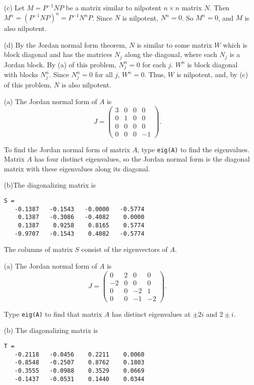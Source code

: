 (c) Let $M = P^{-1}NP$ be a matrix similar to nilpotent $n \times n$
matrix $N$.  Then $M^n = (P^{-1}NP)^n = P^{-1}N^nP$.  Since $N$ is
nilpotent, $N^n = 0$.  So $M^n = 0$, and $M$ is also nilpotent.

(d) By the Jordan normal form theorem, $N$ is similar to some matrix $W$ which
is block diagonal and has the matrices $N_j$ along the diagonal, where each
$N_j$ is a Jordan block.  By (a) of this problem, $N_j^n = 0$ for each
$j$.  $W^n$ is block diagonal with blocks $N_j^n$.  Since $N_j^n = 0$ for all
$j$, $W^n = 0$.  Thus, $W$ is nilpotent, and, by (c) of this problem, $N$
is also nilpotent.

(a) \ans The Jordan normal form of $A$ is
\[
J = \left(\begin{array}{rrrr}
3 & 0 & 0 & 0 \\
0 & 1 & 0 & 0 \\
0 & 0 & 0 & 0 \\
0 & 0 & 0 & -1 \end{array}\right).
\]

\soln
To find the Jordan normal form of matrix $A$, type {\tt eig(A)} to find
the eigenvalues.  Matrix $A$ has four distinct eigenvalues, so the
Jordan normal form is the diagonal matrix with these eigenvalues along
its diagonal.  

(b)\ans   The diagonalizing matrix is
\begin{verbatim}
S =
   -0.1387   -0.1543   -0.0000   -0.5774
    0.1387   -0.3086   -0.4082    0.0000
    0.1387    0.9258    0.8165    0.5774
   -0.9707   -0.1543    0.4082   -0.5774
\end{verbatim}

\soln The columns of matrix $S$ consist of the eigenvectors of $A$.

(a) \ans The Jordan normal form of $A$ is
\[
J = \left(\begin{array}{rrrr}
 0 & 2 &  0 &  0 \\
-2 & 0 &  0 &  0 \\
 0 & 0 & -2 &  1 \\
 0 & 0 & -1 & -2 \end{array}\right).
\]

\soln Type {\tt eig(A)} to find that matrix $A$ has distinct eigenvalues
at $\pm 2i$ and $2 \pm i$.

(b) \ans   The diagonalizing matrix is
\begin{verbatim}
T =
   -0.2118   -0.0456    0.2211    0.0060
   -0.8548   -0.2507    0.8762    0.1803
   -0.3555   -0.0988    0.3529    0.0669
   -0.1437   -0.0531    0.1440    0.0344
\end{verbatim}

